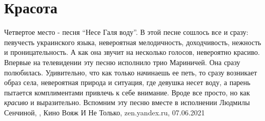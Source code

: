  
 
 
 
 
\chapter{Красота}
\label{sec:slova.krasota}

Четвертое место - песня \enquote{Несе Галя воду}. В этой песне сошлось все и
сразу: певучесть украинского языка, невероятная мелодичность, доходчивость,
нежность и проницательность. А как она звучит на несколько голосов, невероятно
красиво. Впервые на телевидении эту песню исполнило трио Мариничей. Она сразу
полюбилась. Удивительно, что как только начинаешь ее петь, то сразу возникает
образ села, невероятная природа и ситуация, где девушка несет воду, а парень
пытается комплиментами привлечь к себе внимание. Вроде все просто, но как
\emph{красиво} и выразительно. Вспомним эту песню вместе в исполнении Людмилы
Сенчиной,
, 
Кино Вояж И Не Только, zen.yandex.ru, 07.06.2021

